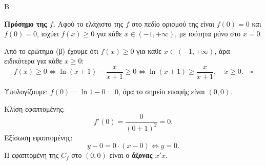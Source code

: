 \begin{thema}{Β}
\begin{erwthma}
\textbf{Πρόσημο της $f$.}
Αφού το ελάχιστο της $f$ στο πεδίο ορισμού της είναι $f(0)=0$ και $f(0)=0$, ισχύει $f(x)\geq0$ για κάθε $x\in(-1,+\infty)$, με ισότητα μόνο στο $x=0$.

\item Από το ερώτημα (β) έχουμε ότι $f(x)\geq0$ για κάθε $x\in(-1,+\infty)$, άρα ειδικότερα για κάθε $x\geq0$:
\[
f(x)\geq0 \Leftrightarrow \ln(x+1)-\frac{x}{x+1}\geq0 \Leftrightarrow \ln(x+1)\geq\frac{x}{x+1},\quad x\geq0.\quad\square
\]

\item Υπολογίζουμε: $f(0)=\ln1-0=0$, άρα το σημείο επαφής είναι $(0,0)$.

Κλίση εφαπτομένης:
\[
f'(0)=\frac{0}{(0+1)^2}=0.
\]
Εξίσωση εφαπτομένης:
\[
y-0=0\cdot(x-0) \Leftrightarrow y=0.
\]
Η εφαπτομένη της $C_f$ στο $(0,0)$ είναι ο \textbf{άξονας $x'x$}.

\end{erwthma}
\end{thema}

